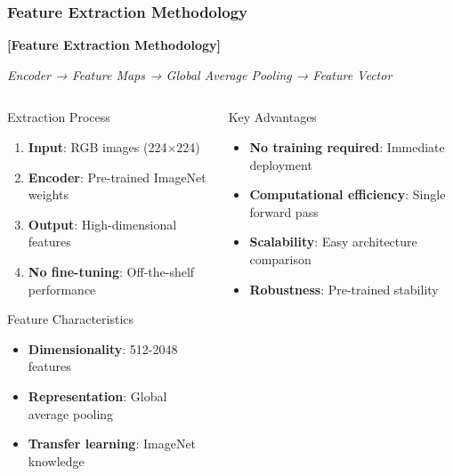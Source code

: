 \documentclass[aspectratio=43]{beamer}
\begin{document}
\begin{frame}
    \frametitle{Feature Extraction Methodology}
    
    \begin{center}
        \textbf{[Feature Extraction Methodology]}
        
        \vspace{0.5cm}
        \textit{Encoder → Feature Maps → Global Average Pooling → Feature Vector}
    \end{center}
    
    \begin{columns}
        \begin{column}{0.5\textwidth}
            \begin{block}{Extraction Process}
                \begin{enumerate}
                    \item \textbf{Input}: RGB images (224×224)
                    \item \textbf{Encoder}: Pre-trained ImageNet weights
                    \item \textbf{Output}: High-dimensional features
                    \item \textbf{No fine-tuning}: Off-the-shelf performance
                \end{enumerate}
            \end{block}
            
            \begin{exampleblock}{Feature Characteristics}
                \begin{itemize}
                    \item \textbf{Dimensionality}: 512-2048 features
                    \item \textbf{Representation}: Global average pooling
                    \item \textbf{Transfer learning}: ImageNet knowledge
                \end{itemize}
            \end{exampleblock}
        \end{column}
        
        \begin{column}{0.5\textwidth}
            \begin{alertblock}{Key Advantages}
                \begin{itemize}
                    \item \textbf{No training required}: Immediate deployment
                    \item \textbf{Computational efficiency}: Single forward pass
                    \item \textbf{Scalability}: Easy architecture comparison
                    \item \textbf{Robustness}: Pre-trained stability
                \end{itemize}
            \end{alertblock}
            

\end{column}
\end{columns}
\end{frame}
\end{document}
